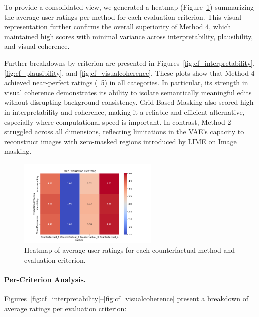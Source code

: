 To provide a consolidated view, we generated a heatmap (Figure~\ref{fig:heatmap_user_eval}) summarizing the average user ratings per method for each evaluation criterion. This visual representation further confirms the overall superiority of Method 4, which maintained high scores with minimal variance across interpretability, plausibility, and visual coherence.

Further breakdowns by criterion are presented in Figures~\ref{fig:cf_interpretability}, \ref{fig:cf_plausibility}, and \ref{fig:cf_visualcoherence}. These plots show that Method 4 achieved near-perfect ratings (~5) in all categories. In particular, its strength in visual coherence demonstrates its ability to isolate semantically meaningful edits without disrupting background consistency. Grid-Based Masking also scored high in interpretability and coherence, making it a reliable and efficient alternative, especially where computational speed is important. In contrast, Method 2 struggled across all dimensions, reflecting limitations in the VAE’s capacity to reconstruct images with zero-masked regions introduced by LIME on Image masking.

\begin{figure}[htbp]
    \centering
    \includegraphics[width=0.6\textwidth]{img/human_rating_results/heatmap_user_evaluations.png}
    \caption{Heatmap of average user ratings for each counterfactual method and evaluation criterion.}
    \label{fig:heatmap_user_eval}
\end{figure}

\vspace{0.5em}
\paragraph{Per-Criterion Analysis.}
Figures~\ref{fig:cf_interpretability}--\ref{fig:cf_visualcoherence} present a breakdown of average ratings per evaluation criterion:

